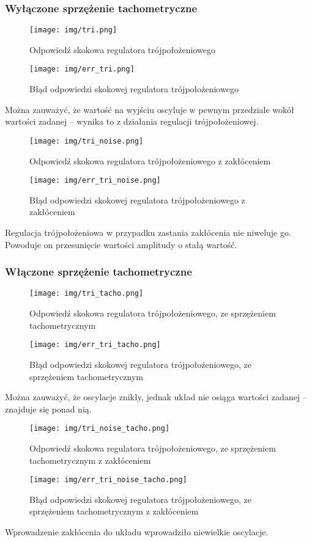 \documentclass[a4paper, 12pt, titlepage]{article}
\begin{document}
			\subsubsection{Wyłączone sprzężenie tachometryczne}
				\begin{figure}[H]
					\centering
					\texttt{[image: img/tri.png]}
					\caption{Odpowiedź skokowa regulatora trójpołożeniowego}
				\end{figure}
				\begin{figure}[H]
					\centering
					\texttt{[image: img/err\_tri.png]}
					\caption{Błąd odpowiedzi skokowej regulatora trójpołożeniowego}
				\end{figure}
				Można zauważyć, że wartość na wyjściu oscyluje w pewnym przedziale wokół wartości zadanej -- wynika to z działania regulacji trójpołożeniowej. 
				\begin{figure}[H]
					\centering
					\texttt{[image: img/tri\_noise.png]}
					\caption{Odpowiedź skokowa regulatora trójpołożeniowego z zakłóceniem}
				\end{figure}
				\begin{figure}[H]
					\centering
					\texttt{[image: img/err\_tri\_noise.png]}
					\caption{Błąd odpowiedzi skokowej regulatora trójpołożeniowego z zakłóceniem}
				\end{figure} \noindent
				Regulacja trójpołożeniowa w przypadku zastania zakłócenia nie niweluje go. Powoduje on przesunięcie wartości amplitudy o stałą wartość.
			\subsubsection{Włączone sprzężenie tachometryczne}
				\begin{figure}[H]
					\centering
					\texttt{[image: img/tri\_tacho.png]}
					\caption{Odpowiedź skokowa regulatora trójpołożeniowego, ze sprzężeniem tachometrycznym}
				\end{figure}
				\begin{figure}[H]
					\centering
					\texttt{[image: img/err\_tri\_tacho.png]}
					\caption{Błąd odpowiedzi skokowej regulatora trójpołożeniowego, ze sprzężeniem tachometrycznym}
				\end{figure}
				Można zauważyć, że oscylacje znikły, jednak układ nie osiąga wartości zadanej -- znajduje się ponad nią.
				\begin{figure}[H]
					\centering
					\texttt{[image: img/tri\_noise\_tacho.png]}
					\caption{Odpowiedź skokowa regulatora trójpołożeniowego, ze sprzężeniem tachometrycznym z zakłóceniem}
				\end{figure}
				\begin{figure}[H]
					\centering
					\texttt{[image: img/err\_tri\_noise\_tacho.png]}
					\caption{Błąd odpowiedzi skokowej regulatora trójpołożeniowego, ze sprzężeniem tachometrycznym z zakłóceniem}
				\end{figure} \noindent
				Wprowadzenie zakłócenia do układu wprowadziło niewielkie oscylacje.
\end{document}
